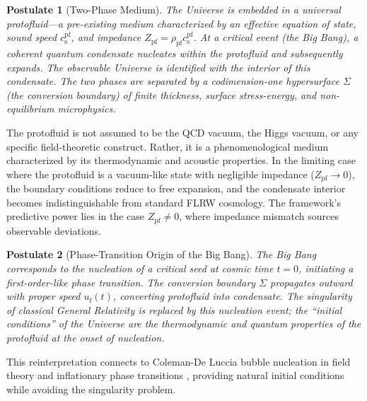 \documentclass[11pt,a4paper]{article}
\newcommand{\cs}{c_{\mathrm{s}}}
\newcommand{\Zpf}{Z_{\mathrm{pf}}}
\newcommand{\uf}{u_{\mathrm{f}}}
\newtheorem{postulate}{Postulate}
\theoremstyle{definition}
\begin{document}
\begin{postulate}[Two-Phase Medium]
\label{post:two_phase}
The Universe is embedded in a \emph{universal protofluid}---a pre-existing medium characterized by an effective equation of state, sound speed $\cs^{\mathrm{pf}}$, and impedance $\Zpf = \rho_{\mathrm{pf}} \cs^{\mathrm{pf}}$. At a critical event (the Big Bang), a \emph{coherent quantum condensate} nucleates within the protofluid and subsequently expands. The observable Universe is identified with the interior of this condensate. The two phases are separated by a codimension-one hypersurface $\Sigma$ (the \emph{conversion boundary}) of finite thickness, surface stress-energy, and non-equilibrium microphysics.
\end{postulate}

The protofluid is not assumed to be the QCD vacuum, the Higgs vacuum, or any specific field-theoretic construct. Rather, it is a phenomenological medium characterized by its thermodynamic and acoustic properties. In the limiting case where the protofluid is a vacuum-like state with negligible impedance ($\Zpf \to 0$), the boundary conditions reduce to free expansion, and the condensate interior becomes indistinguishable from standard FLRW cosmology. The framework's predictive power lies in the case $\Zpf \neq 0$, where impedance mismatch sources observable deviations.

\begin{postulate}[Phase-Transition Origin of the Big Bang]
\label{post:phase_transition}
The Big Bang corresponds to the \emph{nucleation of a critical seed} at cosmic time $t = 0$, initiating a first-order-like phase transition. The conversion boundary $\Sigma$ propagates outward with proper speed $\uf(t)$, converting protofluid into condensate. The singularity of classical General Relativity is replaced by this nucleation event; the ``initial conditions'' of the Universe are the thermodynamic and quantum properties of the protofluid at the onset of nucleation.
\end{postulate}

This reinterpretation connects to Coleman-De Luccia bubble nucleation in field theory \cite{ColemanDeLuccia1980,Coleman1977} and inflationary phase transitions \cite{Linde1990}, providing natural initial conditions while avoiding the singularity problem.
\end{document}
